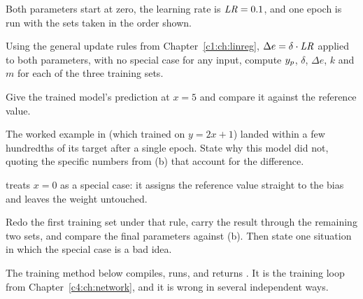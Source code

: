 Both parameters start at zero, the learning rate is $\mathit{LR} = 0.1$, and one epoch is run with the sets
taken in the order shown.

Using the general update rules from Chapter~\ref{c1:ch:linreg}, $\Delta e = \delta \cdot \mathit{LR}$
applied to both parameters, with no special case for any input, compute $y_{p}$, $\delta$, $\Delta e$,
$k$ and $m$ for each of the three training sets. 

 Give the trained model's prediction at $x = 5$ and compare it against the reference
value.

The worked example in  (which trained on $y = 2x + 1$) landed within a few
hundredths of its target after a single epoch. State why this model did not, quoting the specific
numbers from (b) that account for the difference. 

  treats $x = 0$ as a special case: it assigns the
reference value straight to the bias and leaves the weight untouched.

Redo the first training set under that rule, carry the result through the remaining two sets, and
compare the final parameters against (b). Then state one situation in which the special case is a
bad idea. 

\label{exa:q:2}

The training method below compiles, runs, and returns . It is the training loop from
Chapter~\ref{c4:ch:network}, and it is wrong in several independent ways.


